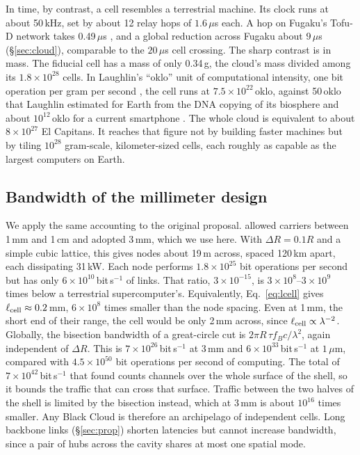 \documentclass[final,5p]{elsarticle}
\newcommand{\lcell}{\ell_{\rm cell}}
\begin{document}
In time, by contrast, a cell resembles a terrestrial machine. Its clock runs at about 50\,kHz, set by about 12 relay hops of $1.6\,\mu$s each. A hop on Fugaku's Tofu-D network takes 0.49\,$\mu$s \citep{Ajima2018}, and a global reduction across Fugaku about $9\,\mu$s (\S\ref{sec:cloud}), comparable to the $20\,\mu$s cell crossing. The sharp contrast is in mass. The fiducial cell has a mass of only 0.34\,g, the cloud's mass divided among its $1.8\times10^{28}$ cells. In Laughlin's ``oklo'' unit of computational intensity, one bit operation per gram per second \citep{Laughlin2014}, the cell runs at $7.5\times10^{22}$\,oklo, against 50\,oklo that Laughlin estimated for Earth from the DNA copying of its biosphere \citep{Laughlin2014,LaughlinAdams2021} and about $10^{12}$\,oklo for a current smartphone \citep{Laughlin2021blog}. The whole cloud is equivalent to about $8\times10^{27}$ El Capitans. It reaches that figure not by building faster machines but by tiling $10^{28}$ gram-scale, kilometer-sized cells, each roughly as capable as the largest computers on Earth.

\subsection{Bandwidth of the millimeter design}\label{sec:submm}
We apply the same accounting to the original proposal. \citet{LaughlinAdams2021} allowed carriers between 1\,mm and 1\,cm and adopted 3\,mm, which we use here. With $\Delta R=0.1R$ and a simple cubic lattice, this gives nodes about 19\,m across, spaced 120\,km apart, each dissipating 31\,kW. Each node performs $1.8\times10^{25}$ bit operations per second but has only $6\times10^{10}$\,bit\,s$^{-1}$ of links. That ratio, $3\times10^{-15}$, is $3\times10^{8}$--$3\times10^{9}$ times below a terrestrial supercomputer's. Equivalently, Eq.~\eqref{eq:lcell} gives $\lcell\approx0.2$\,mm, $6\times10^{8}$ times smaller than the node spacing. Even at 1\,mm, the short end of their range, the cell would be only 2\,mm across, since $\lcell\propto\lambda^{-2}$. Globally, the bisection bandwidth of a great-circle cut is $2\pi R\,\tau f_B c/\lambda^2$, again independent of $\Delta R$. This is $7\times10^{26}$\,bit\,s$^{-1}$ at 3\,mm and $6\times10^{33}$\,bit\,s$^{-1}$ at $1\,\mu$m, compared with $4.5\times10^{50}$ bit operations per second of computing. The total of $7\times10^{42}$\,bit\,s$^{-1}$ that \citet{LaughlinAdams2021} found counts channels over the whole surface of the shell, so it bounds the traffic that can cross that surface. Traffic between the two halves of the shell is limited by the bisection instead, which at 3\,mm is about $10^{16}$ times smaller. Any Black Cloud is therefore an archipelago of independent cells. Long backbone links (\S\ref{sec:prop}) shorten latencies but cannot increase bandwidth, since a pair of hubs across the cavity shares at most one spatial mode.
\end{document}

